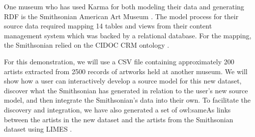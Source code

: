 One museum who has used Karma for both modeling their data and generating RDF is the Smithsonian American Art Museum \cite{Szekely:2013vq}. 
The model process for their source data required mapping 14 tables and views from their content management system which was backed by a relational database.
For the mapping, the Smithsonian relied on the CIDOC CRM ontology \cite{Doerr:2003:CCR:958671.958678}.

For this demonstration, we will use a CSV file containing approximately 200 artists extracted from 2500 records of artworks held at another museum.
We will show how a user can interactively develop a source model for this new dataset, discover what the Smithsonian has generated in relation to the user's new source model, and then integrate the Smithsonian's data into their own.  
To facilitate the discovery and integration, we have also generated a set of owl:sameAs links between the artists in the new dataset and the artists from the Smithsonian dataset using LIMES \cite{ngomo2011limes}.